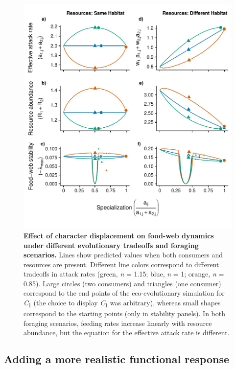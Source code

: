 \documentclass[11pt,]{article}
\begin{document}
\begin{figure}
\centering
\includegraphics{Fig_3_MacArthur_LawlorSmith.pdf}
\caption{\label{fig:plot_fig3}\textbf{Effect of character displacement
on food-web dynamics under different evolutionary tradeoffs and foraging
scenarios.} Lines show predicted values when both consumers and
resources are present. Different line colors correspond to different
tradeoffs in attack rates (green, \emph{n} = 1.15; blue, \emph{n} = 1;
orange, \emph{n} = 0.85). Large circles (two consumers) and triangles
(one consumer) correspond to the end points of the eco-evolutionary
simulation for \emph{C}\textsubscript{1} (the choice to display
\emph{C}\textsubscript{1} was arbitrary), whereas small shapes
correspond to the starting points (only in stability panels). In both
foraging scenarios, feeding rates increase linearly with resource
abundance, but the equation for the effective attack rate is different.}
\end{figure}

\subsection{Adding a more realistic functional
response}\label{adding-a-more-realistic-functional-response}
\end{document}
